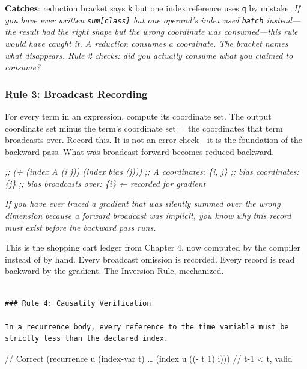 \documentclass[11pt,titlepage]{article}
\newenvironment{Shaded}{}{}
\newcommand{\CommentTok}[1]{\textcolor[rgb]{0.38,0.63,0.69}{\textit{#1}}}
\begin{document}
\textbf{Catches}: reduction bracket says \texttt{k} but one index
reference uses \texttt{q} by mistake. \emph{If you have ever written
\texttt{sum{[}class{]}} but one operand's index used \texttt{batch}
instead---the result had the right shape but the wrong coordinate was
consumed---this rule would have caught it. A reduction consumes a
coordinate. The bracket names what disappears. Rule 2 checks: did you
actually consume what you claimed to consume?}

\hypertarget{rule-3-broadcast-recording}{%
\subsubsection{Rule 3: Broadcast
Recording}\label{rule-3-broadcast-recording}}

For every term in an expression, compute its coordinate set. The output
coordinate set minus the term's coordinate set = the coordinates that
term broadcasts over. Record this. It is not an error check---it is the
foundation of the backward pass. What was broadcast forward becomes
reduced backward.

\begin{Shaded}
\begin{Highlighting}[]
\CommentTok{;; (+ (index A (i j)) (index bias (j)))}
\CommentTok{;; A coordinates: \{i, j\}}
\CommentTok{;; bias coordinates: \{j\}}
\CommentTok{;; bias broadcasts over: \{i\}  ← recorded for gradient}
\end{Highlighting}
\end{Shaded}

\emph{If you have ever traced a gradient that was silently summed over
the wrong dimension because a forward broadcast was implicit, you know
why this record must exist before the backward pass runs.}

This is the shopping cart ledger from Chapter 4, now computed by the
compiler instead of by hand. Every broadcast omission is recorded. Every
record is read backward by the gradient. The Inversion Rule, mechanized.

\begin{verbatim}

### Rule 4: Causality Verification

In a recurrence body, every reference to the time variable must be strictly less than the declared index.
\end{verbatim}

// Correct (recurrence u (index-var t) \ldots{} (index u ((- t 1) i)))
// t-1 \textless{} t, valid
\end{document}
